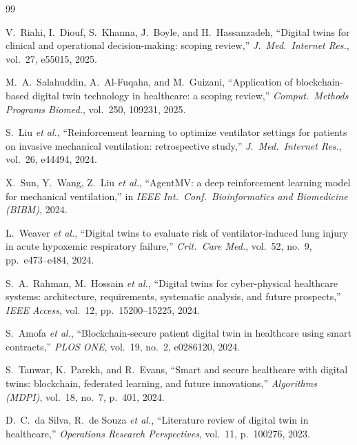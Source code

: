 \documentclass[conference]{IEEEtran}
\begin{document}
\begin{thebibliography}{99}

V.\ Riahi, I.\ Diouf, S.\ Khanna, J.\ Boyle, and H.\ Hassanzadeh,
``Digital twins for clinical and operational decision-making: scoping review,''
\emph{J.\ Med.\ Internet Res.}, vol.~27, e55015, 2025.

M.\ A.\ Salahuddin, A.\ Al-Fuqaha, and M.\ Guizani,
``Application of blockchain-based digital twin technology in healthcare: a scoping review,''
\emph{Comput.\ Methods Programs Biomed.}, vol.~250, 109231, 2025.

S.\ Liu \emph{et al.},
``Reinforcement learning to optimize ventilator settings for patients on invasive mechanical ventilation: retrospective study,''
\emph{J.\ Med.\ Internet Res.}, vol.~26, e44494, 2024.

X.\ Sun, Y.\ Wang, Z.\ Liu \emph{et al.},
``AgentMV: a deep reinforcement learning model for mechanical ventilation,''
in \emph{IEEE Int.\ Conf.\ Bioinformatics and Biomedicine (BIBM)}, 2024.

L.\ Weaver \emph{et al.},
``Digital twins to evaluate risk of ventilator-induced lung injury in acute hypoxemic respiratory failure,''
\emph{Crit.\ Care Med.}, vol.~52, no.~9, pp.~e473--e484, 2024.

S.\ A.\ Rahman, M.\ Hossain \emph{et al.},
``Digital twins for cyber-physical healthcare systems: architecture, requirements, systematic analysis, and future prospects,''
\emph{IEEE Access}, vol.~12, pp.~15200--15225, 2024.

S.\ Amofa \emph{et al.},
``Blockchain-secure patient digital twin in healthcare using smart contracts,''
\emph{PLOS ONE}, vol.~19, no.~2, e0286120, 2024.

S.\ Tanwar, K.\ Parekh, and R.\ Evans,
``Smart and secure healthcare with digital twins: blockchain, federated learning, and future innovations,''
\emph{Algorithms (MDPI)}, vol.~18, no.~7, p.~401, 2024.

D.\ C.\ da Silva, R.\ de Souza \emph{et al.},
``Literature review of digital twin in healthcare,''
\emph{Operations Research Perspectives}, vol.~11, p.~100276, 2023.


\end{thebibliography}
\end{document}
